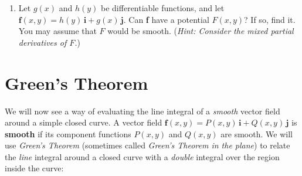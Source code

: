 \begin{multicols}{2}
\begin{enumerate}[\bfseries 1.]
\begin{enumerate}[(a)]
   \item Show that $\displaystyle\olineintvec{C}{f}{r} = 2\pi$. Does this contradict Corollary
    \ref{cor:lineintsuffpath}? Explain.
  \end{enumerate}
[{[\bfseries 1.]}]
 \item Let $g(x)$ and $h(y)$ be differentiable functions, and let $\textbf{f}(x,y)=h(y)\,\textbf{i} + g(x)\,\textbf{j}$.
  Can \textbf{f} have a potential $F(x,y)$? If so, find it. You may assume that $F$ would be smooth. (\emph{Hint:
  Consider the mixed partial derivatives of $F$.})
\end{enumerate}
\end{multicols}

\section{Green's Theorem}
We will now see a way of evaluating the line integral of a \emph{smooth} vector field
around a simple closed curve. 
A vector field $\textbf{f}(x,y) = P(x,y)\,\textbf{i} + Q(x,y)\,\textbf{j}$ is \textbf{smooth} if its
component functions $P(x,y)$ and $Q(x,y)$ are smooth.
We will use
\emph{Green's Theorem} (sometimes called \emph{Green's Theorem in the plane}) to relate the \emph{line} integral around
a closed curve with a \emph{double} integral over the region inside the curve:

